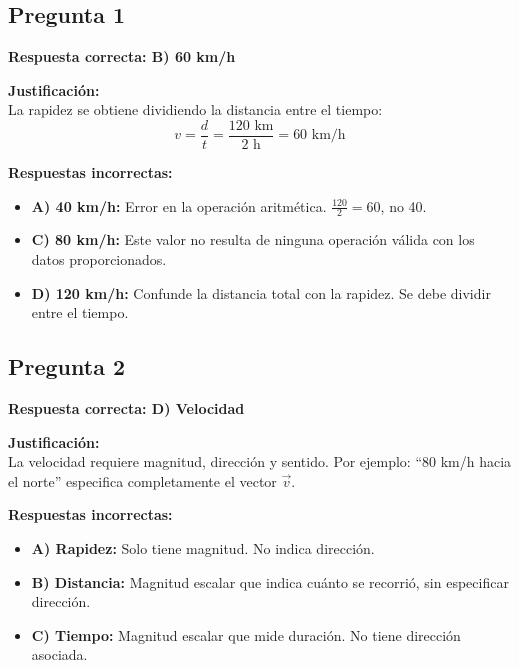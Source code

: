 \begin{respuestabox}
\subsection{Pregunta 1}
\textcolor{verdecorrecto}{\textbf{Respuesta correcta: B) 60 km/h}}

\textbf{Justificación:}\\
La rapidez se obtiene dividiendo la distancia entre el tiempo:
$$v = \frac{d}{t} = \frac{120 \text{ km}}{2 \text{ h}} = 60 \text{ km/h}$$

\textbf{Respuestas incorrectas:}
\begin{itemize}
    \item \textbf{A) 40 km/h:} Error en la operación aritmética. $\frac{120}{2} = 60$, no 40.
    \item \textbf{C) 80 km/h:} Este valor no resulta de ninguna operación válida con los datos proporcionados.
    \item \textbf{D) 120 km/h:} Confunde la distancia total con la rapidez. Se debe dividir entre el tiempo.
\end{itemize}
\end{respuestabox}

\begin{respuestabox}
\subsection{Pregunta 2}
\textcolor{verdecorrecto}{\textbf{Respuesta correcta: D) Velocidad}}

\textbf{Justificación:}\\
La velocidad requiere magnitud, dirección y sentido. Por ejemplo: ``80 km/h hacia el norte'' especifica completamente el vector $\vec{v}$.

\textbf{Respuestas incorrectas:}
\begin{itemize}
    \item \textbf{A) Rapidez:} Solo tiene magnitud. No indica dirección.
    \item \textbf{B) Distancia:} Magnitud escalar que indica cuánto se recorrió, sin especificar dirección.
    \item \textbf{C) Tiempo:} Magnitud escalar que mide duración. No tiene dirección asociada.
\end{itemize}
\end{respuestabox}

